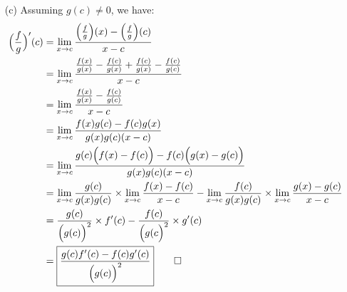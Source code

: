 \documentclass[11pt]{article}
\begin{document}
\begin{itemize}
\begin{itemize}
            \item[(c)]
                Assuming $g(c) \neq 0$, we have:
                \begin{align*}
                    \Big(\frac{f}{g}\Big)^\prime(c) &= \lim_{x \to c}{\frac{\Big(\frac{f}{g}\Big)(x) - \Big(\frac{f}{g}\Big)(c)}{x - c}}\\
                                                    &= \lim_{x \to c}{\frac{\frac{f(x)}{g(x)} - \frac{f(c)}{g(x)} + \frac{f(c)}{g(x)} - \frac{f(c)}{g(c)}}{x - c}}\\
                                                    &= \lim_{x \to c}{\frac{\frac{f(x)}{g(x)} - \frac{f(c)}{g(c)}}{x - c}}\\
                                                    &= \lim_{x \to c}{\frac{f(x)g(c) - f(c)g(x)}{g(x)g(c)(x - c)}}\\
                                                    &= \lim_{x \to c}{\frac{g(c)\Big(f(x) - f(c)\Big) - f(c)\Big(g(x) - g(c)\Big)}{g(x)g(c)(x - c)}}\\
                                                    &= \lim_{x \to c}{\frac{g(c)}{g(x)g(c)}} \times \lim_{x \to c}{\frac{f(x) - f(c)}{x - c}} - \lim_{x \to c}{\frac{f(c)}{g(x)g(c)}} \times \lim_{x \to c}{\frac{g(x) - g(c)}{x - c}}\\
                                                    &= \frac{g(c)}{\Big(g(c)\Big)^2} \times f^\prime(c) - \frac{f(c)}{\Big(g(c\Big)^2} \times g^\prime(c)\\
                                                    &= \boxed{\frac{g(c)f^\prime(c) - f(c)g^\prime(c)}{\Big(g(c)\Big)^2}}
                    \qed
                \end{align*}
        \end{itemize}


\end{itemize}
\end{document}
